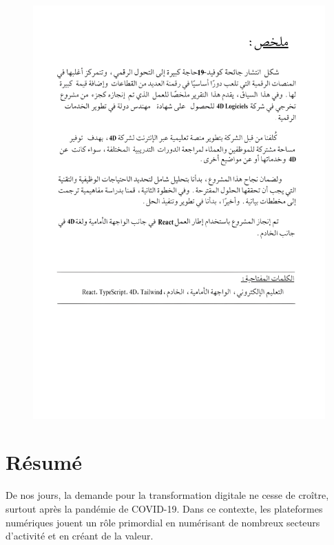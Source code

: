 

\begin{figure}[H]
    \thispagestyle{plain}
    \centering
    \includegraphics[width=19cm]{Figures/abstract.png}
\end{figure}


\newpage

\chapter*{Résumé}


De nos jours, la demande pour la transformation digitale ne cesse de croître, surtout après la pandémie de COVID-19. Dans ce contexte, les plateformes numériques jouent un rôle primordial en numérisant de nombreux secteurs d'activité et en créant de la valeur.
\vspace{10pt}

